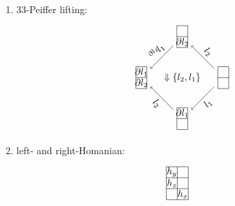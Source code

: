 \documentclass[11pt, reqno]{amsart} %
\newcommand{\act}[1]{\,\sp{#1}\!}
\newcommand{\strrect}[3][]{
  \begin{scope}[every node/.append style={overlay},#1]
    \foreach \x [count=\i] in {#3}{
      \ifx\x\empty
      \else
        \pgfmathsetmacro{\modResult}{mod(\i-1, #2)}
        \pgfmathsetmacro{\quotResult}{(\i-\modResult-1)/#2}
        \node at (\modResult,-\quotResult) {\x};
      \fi
    }
    \foreach \x in {0,1,...,#2}{
      \draw ({-1/2+\x},{1/2})--({-1/2+\x},{-#2+1/2});
      \draw ({-1/2},{1/2-\x})--({#2-1/2},{1/2-\x});
    }
  \end{scope}
}
\newcommand{\strsquare}[4][]{
  \begin{scope}[every node/.append style={overlay},#1]
    \foreach \x [count=\i] in {#4}{
      \ifx\x\empty
      \else
        \pgfmathsetmacro{\modResult}{mod(\i-1, #2)}
        \pgfmathsetmacro{\quotResult}{(\i-\modResult-1)/#2}
        \node at (\modResult,-\quotResult) {\x};
      \fi
    }
    \foreach \x in {0,1,...,#2}{
      \draw ({-1/2+\x},{1/2})--({-1/2+\x},{-#3+1/2});
    }
    \foreach \y in {0,1,...,#3}{
      \draw ({-1/2},{1/2-\y})--({#2-1/2},{1/2-\y});
    }
  \end{scope}
}
\theoremstyle{definition}
\theoremstyle{remark}
\numberwithin{equation}{section}
\begin{document}
\begin{enumerate}
\begin{align}
\begin{tikzpicture}[baseline=-2pt]
      \node (C) at (-1.5,0) {\tikz[baseline=-2pt,scale=.4]{\strrect{2}{,$h$,$\partial l$,}}};
      \draw [->] (A) to node [anchor=south,sloped] {$\act{h}l$} (B);
      \draw [->] (B) to node [anchor=south,sloped,transform shape,scale=.75] {$\{\partial l,h\}$} (C);
      \draw [->] (A) to node [fill=white] (D) {$l$} (C);
      \path (B) to node [transform shape,scale=.75] {$\Downarrow \left<l,h\right>$} (D);
    \end{tikzpicture}, &
    &
    \begin{tikzpicture}[baseline=-2pt]
      \node (A) at (1.5,0) {\tikz[baseline=-2pt,scale=.4]{\strrect{2}{$h$,,,}}};
      \node (B) at (0,1.75) {\tikz[baseline=-2pt,scale=.4]{\strrect{2}{$h$,,,$\partial l$}}};
      \node (C) at (-1.5,0) {\tikz[baseline=-2pt,scale=.4]{\strrect{2}{,$\partial l$,$h$,}}};
      \draw [->] (A) to node [anchor=south,sloped] {$\act{\partial h}l$} (B);
      \draw [->] (B) to node [anchor=south,sloped,transform shape,scale=.75] {$\{h,\partial l\}$} (C);
      \draw [->] (A) to node [fill=white] (D) {$\act{h}l$} (C);
      \path (B) to node [transform shape,scale=.75] {$\Downarrow \left<h,l\right>$} (D);
    \end{tikzpicture}
  \end{align}
  where $\left<h,l\right>:=\act{\act{h}l}\{h,l^{-1}\}^{-1}$ and $\left<l,h\right>:=\act{l}\{l^{-1},h\}^{-1}$.
  \item [$\bullet$] 33-Peiffer lifting:
  \[
    \begin{tikzpicture}[baseline=-2pt]
      \node (A) at (1.5,0) {\tikz[baseline=-2pt,scale=.4]{\strsquare{1}{2}{}}};
      \node (B1) at (0,1.5) {\tikz[baseline=-2pt,scale=.4]{\strsquare{1}{2}{,$\partial l_2$}}};
      \node (B2) at (0,-1.5) {\tikz[baseline=-2pt,scale=.4]{\strsquare{1}{2}{$\partial l_1$}}};
      \node (C) at (-1.5,0) {\tikz[baseline=-2pt,scale=.4]{\strsquare{1}{2}{$\partial l_1$,$\partial l_2$}}};
      \draw [->] (A) to node [anchor=south,sloped] {$l_2$} (B1);
      \draw [->] (B1) to node [anchor=south,sloped] {$\act{\partial l_2}l_1$} (C);
      \draw [->] (A) to node [anchor=north,sloped] {$l_1$} (B2);
      \draw [->] (B2) to node [anchor=north,sloped] {$l_2$} (C);
      \path (B1) to node {$\Downarrow\{l_2,l_1\}$} (B2);
    \end{tikzpicture}
  \]
  \item [$\bullet$] left- and right-Homanian:
  \begin{align}
    \nonumber
    &
    \begin{tikzpicture}[baseline=-2pt]
      \node (A) at (2,0) {\tikz[baseline=-2pt,scale=.4]{\strsquare{2}{3}{$h_y$,,$h_z$,,,$h_x$}}};

\end{tikzpicture}
\end{align}
\end{enumerate}
\end{document}
